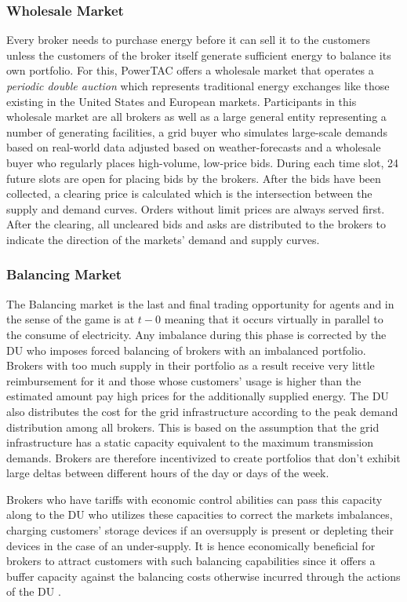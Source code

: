 \subsubsection{Wholesale Market}
Every broker needs to purchase energy before it can sell it to the customers unless the customers of the broker itself
generate sufficient energy to balance its own portfolio. For this, \ac{PowerTAC} offers a wholesale market that operates
a \emph{periodic double auction} which represents traditional energy exchanges like those existing in the United States
and European markets. Participants in this wholesale market are all brokers as well as a large general entity
representing a number of generating facilities, a grid buyer who simulates large-scale demands based on real-world data
adjusted based on weather-forecasts and a wholesale buyer who regularly places high-volume, low-price bids. During each
time slot, 24 future slots are open for placing bids by the brokers. After the bids have been collected, a clearing
price is calculated which is the intersection between the supply and demand curves. Orders without limit prices are
always served first. After the clearing, all uncleared bids and asks are distributed to the brokers to indicate the
direction of the markets' demand and supply curves.

\subsubsection{Balancing Market} The Balancing market is the last and final trading opportunity for agents and in the
sense of the game is at $t-0$ meaning that it occurs virtually in parallel to the consume of electricity. Any imbalance
during this phase is corrected by the \ac{DU} who imposes forced balancing of brokers with an imbalanced
portfolio. Brokers with too much supply in their portfolio as a result receive very little reimbursement for it and those
whose customers' usage is higher than the estimated amount pay high prices for the additionally supplied energy. The
\ac{DU} also distributes the cost for the grid infrastructure according to the peak demand distribution among all
brokers. This is based on the assumption that the grid infrastructure has a static capacity equivalent to the maximum
transmission demands. Brokers are therefore incentivized to create portfolios that don't exhibit large deltas between
different hours of the day or days of the week.

Brokers who have tariffs with economic control abilities can pass this capacity along to the \ac{DU} who utilizes these
capacities to correct the markets imbalances, charging customers' storage devices if an oversupply is present or
depleting their devices in the case of an under-supply. It is hence economically beneficial for brokers to attract
customers with such balancing capabilities since it offers a buffer capacity against the balancing costs otherwise
incurred through the actions of the \ac{DU} \citep[p.5]{ketter2018powertac}.

